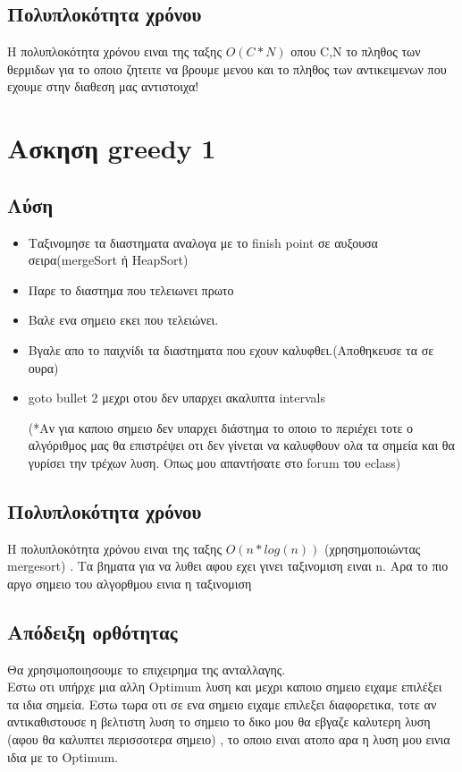 \documentclass[12pt]{article}
\begin{document}
\subsection{Πολυπλοκότητα χρόνου} 
Η πολυπλοκότητα χρόνου ειναι της ταξης $Ο(C*N)$ οπου C,Ν το πληθος των θερμιδων για το οποιο ζητειτε να βρουμε μενου
και το πληθος των αντικειμενων που εχουμε στην διαθεση μας αντιστοιχα!

\newpage
\section{Ασκηση greedy 1}

\subsection{Λύση}

\begin{itemize}
	\item Ταξινομησε τα διαστηματα αναλογα με το finish point σε αυξουσα σειρα(mergeSort ή HeapSort)
	\item Παρε το διαστημα που τελειωνει πρωτο
	\item Βαλε ενα σημειο εκει που τελειώνει.
	\item Βγαλε απο το παιχνίδι τα διαστηματα που εχουν καλυφθει.(Αποθηκευσε τα σε ουρα)
	\item goto bullet 2 μεχρι οτου δεν υπαρχει ακαλυπτα intervals
	
	(*Αν για καποιο σημειο δεν υπαρχει διάστημα το οποιο το περιέχει τοτε ο αλγόριθμος μας θα επιστρέψει οτι δεν γίνεται να καλυφθουν ολα τα σημεία και θα γυρίσει την τρέχων λυση. Οπως μου απαντήσατε στο forum του eclass)
	
\end{itemize}


\subsection{Πολυπλοκότητα χρόνου} 
Η πολυπλοκότητα χρόνου ειναι της ταξης $Ο(n*log(n))$ (χρησημοποιώντας mergesort) .
Τα βηματα για να λυθει αφου εχει γινει ταξινομιση ειναι n. Αρα το πιο αργο σημειο του αλγορθμου εινια η ταξινομιση

\subsection{Απόδειξη ορθότητας} 
Θα χρησιμοποιησουμε το επιχειρημα της ανταλλαγης. \\
Εστω οτι υπήρχε μια αλλη Optimum λυση και μεχρι καποιο σημειο ειχαμε επιλέξει τα ιδια σημεία. Εστω τωρα οτι σε ενα σημειο ειχαμε επιλεξει διαφορετικα, τοτε αν αντικαθιστουσε η βελτιστη λυση το σημειο το δικο μου θα εβγαζε καλυτερη λυση (αφου θα καλυπτει περισσοτερα σημειο) , το οποιο ειναι ατοπο αρα η λυση μου εινια ιδια με το Optimum.
\end{document}
